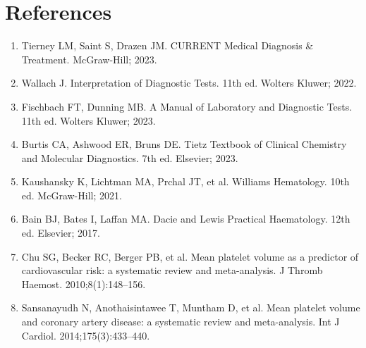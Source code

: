 \section*{References}
\begin{enumerate}
  \item Tierney LM, Saint S, Drazen JM. CURRENT Medical Diagnosis \& Treatment. McGraw-Hill; 2023.
  \item Wallach J. Interpretation of Diagnostic Tests. 11th ed. Wolters Kluwer; 2022.
  \item Fischbach FT, Dunning MB. A Manual of Laboratory and Diagnostic Tests. 11th ed. Wolters Kluwer; 2023.
  \item Burtis CA, Ashwood ER, Bruns DE. Tietz Textbook of Clinical Chemistry and Molecular Diagnostics. 7th ed. Elsevier; 2023.
  \item Kaushansky K, Lichtman MA, Prchal JT, et al. Williams Hematology. 10th ed. McGraw-Hill; 2021.
  \item Bain BJ, Bates I, Laffan MA. Dacie and Lewis Practical Haematology. 12th ed. Elsevier; 2017.
  \item Chu SG, Becker RC, Berger PB, et al. Mean platelet volume as a predictor of cardiovascular risk: a systematic review and meta-analysis. J Thromb Haemost. 2010;8(1):148--156.
  \item Sansanayudh N, Anothaisintawee T, Muntham D, et al. Mean platelet volume and coronary artery disease: a systematic review and meta-analysis. Int J Cardiol. 2014;175(3):433--440.
\end{enumerate}

\clearpage
